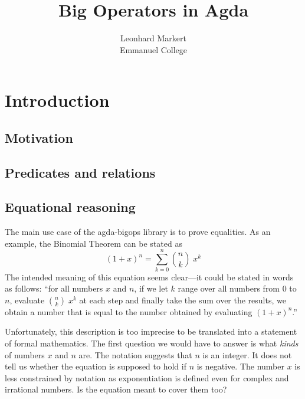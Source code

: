 

\title{Big Operators in Agda}
\author{Leonhard Markert \\ Emmanuel College}



\begin{titlepage}
\maketitle
\tableofcontents
\end{titlepage}

\chapter{Introduction}

\section{Motivation}

\section{Predicates and relations}

\section{Equational reasoning}

The main use case of the agda-bigops library is to prove equalities. As an example, the Binomial Theorem can be stated as \[ (1 + x)^n = \sum_{k = 0}^n \binom{n}{k} \; x^k \]
The intended meaning of this equation seems clear---it could be stated in words as follows: \enquote{for all numbers \(x\) and \(n\), if we let \(k\) range over all numbers from \(0\) to \(n\), evaluate \(\binom{n}{k} \; x^k\) at each step and finally take the sum over the results, we obtain a number that is equal to the number obtained by evaluating \((1 + x)^n\).}

Unfortunately, this description is too imprecise to be translated into a statement of formal mathematics. The first question we would have to answer is what \emph{kinds} of numbers \(x\) and \(n\) are. The notation suggests that \(n\) is an integer. It does not tell us whether the equation is supposed to hold if \(n\) is negative. The number \(x\) is less constrained by notation as exponentiation is defined even for complex and irrational numbers. Is the equation meant to cover them too?

